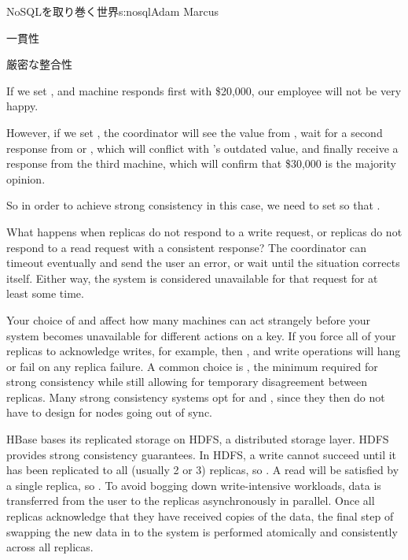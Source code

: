 \begin{aosachapter}{NoSQLを取り巻く世界}{s:nosql}{Adam Marcus}
\begin{aosasect1}{一貫性}
\begin{aosasect2}{厳密な整合性}
\begin{aosaitemize}

  \item If we set , and machine  responds first with
  \$20,000, our employee will not be very happy.

  \item However, if we set , the coordinator will see the
  value from , wait for a second response from  or
  , which will conflict with 's outdated value, and
  finally receive a response from the third machine, which will
  confirm that \$30,000 is the majority opinion.

\end{aosaitemize}

So in order to achieve strong consistency in this case, we need to set
 so that .

What happens when  replicas do not respond to a write request,
or  replicas do not respond to a read request with a
consistent response?  The coordinator can timeout eventually and send
the user an error, or wait until the situation corrects itself.
Either way, the system is considered unavailable for that request for
at least some time.

Your choice of  and  affect how many machines can act
strangely before your system becomes unavailable for different actions
on a key.  If you force all of your replicas to acknowledge writes,
for example, then , and write operations will hang or fail
on any replica failure.  A common choice is ,
the minimum required for strong consistency while still allowing for
temporary disagreement between replicas.  Many strong consistency
systems opt for  and , since they then do not have
to design for nodes going out of sync.

HBase bases its replicated storage on HDFS, a distributed storage layer.  HDFS provides strong consistency
guarantees.  In HDFS, a write cannot succeed until it has been
replicated to all  (usually 2 or 3) replicas, so .
A read will be satisfied by a single replica, so .  To
avoid bogging down write-intensive workloads, data is transferred from
the user to the replicas asynchronously in parallel.  Once all
replicas acknowledge that they have received copies of the data, the
final step of swapping the new data in to the system is performed
atomically and consistently across all replicas.


\end{aosasect2}
\end{aosasect1}
\end{aosachapter}
